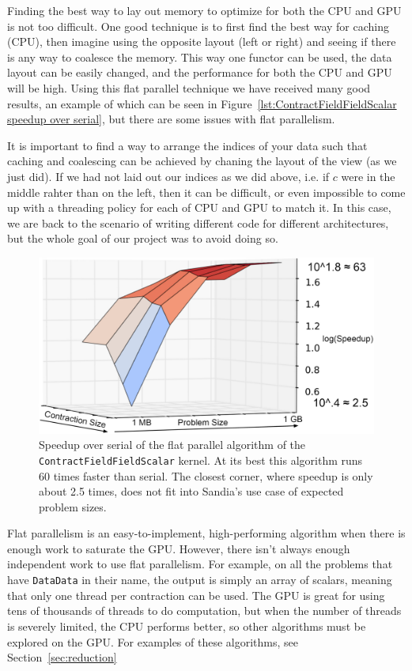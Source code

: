 Finding the best way to lay out memory to optimize for both the CPU and GPU is
not too difficult. One good technique is to first find the best way for caching (CPU),
then imagine using the opposite layout (left or right) and seeing if there is
any way to coalesce the memory. This way one functor can be used, the data
layout can be easily changed, and the performance for both the CPU and GPU will
be high. Using this flat parallel technique we have received many good results,
an example of which can be seen in Figure~\ref{lst:ContractFieldFieldScalar
speedup over serial}, but there are some issues with flat parallelism.

It is important to find a way to arrange the indices of your data such that 
caching and coalescing can be achieved by chaning the layout of the view (as we just did).
If we had not laid out our indices as we did above, i.e. if $c$ were in the middle rahter 
than on the left, then it can be difficult, or even impossible to come up with a threading 
policy for each of CPU and GPU to match it. In this case, we are back to the scenario of 
writing different code for different architectures, but the whole goal of our project 
was to avoid doing so.

\begin{figure}[!ht]
\includegraphics[scale=.8]{CFFSIndependent2.PNG}
\caption[Performance of \texttt{ContractFieldFieldScalar} flat parallel]
{Speedup over serial of the flat parallel algorithm of the
\texttt{ContractFieldFieldScalar} kernel. At its best this algorithm runs 60
times faster than serial. The closest corner, where speedup is only about 2.5
times, does not fit into Sandia's use case of expected problem sizes.
\label{lst:ContractFieldFieldScalar speedup over serial}} 
\end{figure}

Flat parallelism is an easy-to-implement, high-performing algorithm when there is 
enough work to saturate the GPU. However, there isn't always enough independent work to 
use flat parallelism. For example, on all the problems that have \texttt{DataData}
in their name, the output is simply an array of scalars, meaning that only one
thread per contraction can be used. The GPU is great for using tens of
thousands of threads to do computation, but when the number of threads is
severely limited, the CPU performs better, so other algorithms must be explored on the GPU. 
For examples of these algorithms, see Section~\ref{sec:reduction}

